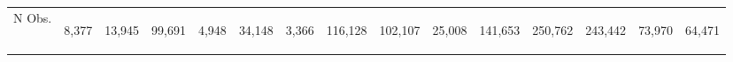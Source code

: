 \begin{center}
\begin{tabular}{lcccccccccccccc}
\noalign{\smallskip}\hline N Obs. & \begin{normalsize}8,377\end{normalsize} & \begin{normalsize}13,945\end{normalsize} & \begin{normalsize}99,691\end{normalsize} & \begin{normalsize}4,948\end{normalsize} & \begin{normalsize}34,148\end{normalsize} & \begin{normalsize}3,366\end{normalsize} & \begin{normalsize}116,128\end{normalsize} & \begin{normalsize}102,107\end{normalsize} & \begin{normalsize}25,008\end{normalsize} & \begin{normalsize}141,653\end{normalsize} & \begin{normalsize}250,762\end{normalsize} & \begin{normalsize}243,442\end{normalsize} & \begin{normalsize}73,970\end{normalsize} & \begin{normalsize}64,471\end{normalsize}\\

\end{tabular}
\end{center}
